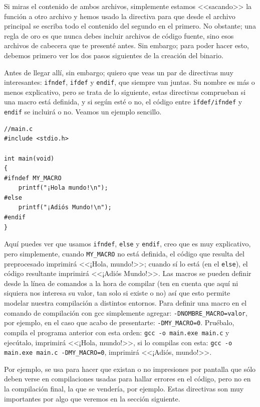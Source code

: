 \documentclass[a4paper]{article}
\begin{document}
Si miras el contenido de ambos archivos, simplemente estamos <<sacando>> la
función a otro archivo y hemos usado la directiva para que desde el archivo
principal se escriba todo el contenido del segundo en el primero. No obstante;
una regla de oro es que nunca debes incluir archivos de código fuente, sino esos
archivos de cabecera que te presenté antes. Sin embargo;
para poder hacer esto, debemos primero ver los dos pasos siguientes de la
creación del binario.

Antes de llegar allí, sin embargo; quiero que veas un par de directivas muy
interesantes: \verb!ifndef!, \verb!ifdef! y
\verb!endif!, que siempre van juntas. Su nombre
es más o menos explicativo, pero se trata de lo siguiente, estas directivas
comprueban si una macro está definida, y si según esté o no, el código
entre \verb!ifdef/ifndef! y \verb!endif! se incluirá o no. Veamos un ejemplo
sencillo.

\noindent
\begin{minipage}[H]{\linewidth}
\mbox{}
\begin{lstlisting}[style=C,
caption={Uso de directivas \texttt{ifdef} e \texttt{ifndef}},
label={lst:ifdefAndIfndef}]
//main.c
#include <stdio.h>

int main(void)
{
#ifndef MY_MACRO
    printf("¡Hola mundo!\n");
#else
    printf("¡Adiós Mundo!\n");
#endif
}
\end{lstlisting}
\end{minipage}

Aquí puedes ver que usamos \verb!ifndef!, \verb!else! y \verb!endif!, creo
que es muy explicativo, pero simplemente, cuando \verb!MY_MACRO! no está
definida, el código que resulta del preprocesado imprimirá <<¡Hola, mundo!>>;
cuando sí lo está (en el \verb!else!), el código resultante
imprimirá <<¡Adiós Mundo!>>. Las macros se pueden definir desde la línea de
comandos a la hora de compilar (ten en cuenta que aquí ni siquiera nos
interesa su valor, tan solo si existe o no) así que esto permite
modelar nuestra compilación a distintos entornos.
Para definir una macro en el comando de compilación con gcc simplemente
agregar: \verb!-DNOMBRE_MACRO=valor!, por ejemplo, en el caso que acabo
de presentarte: \verb!-DMY_MACRO=0!. Pruébalo, compila el programa anterior
con esta orden: \verb!gcc -o main.exe main.c! y ejecútalo, imprimirá <<¡Hola,
mundo!>>, si lo compilas con esta: \verb!gcc -o main.exe main.c -DMY_MACRO=0!,
imprimirá <<¡Adiós, mundo!>>.

Por ejemplo, se usa para
hacer que existan o no impresiones por pantalla que sólo deben verse en
compilaciones usadas para hallar errores en el código, pero no en la compilación
final, la que se vendería, por ejemplo. Estas directivas son muy importantes
por algo que veremos en la sección siguiente.
\end{document}

